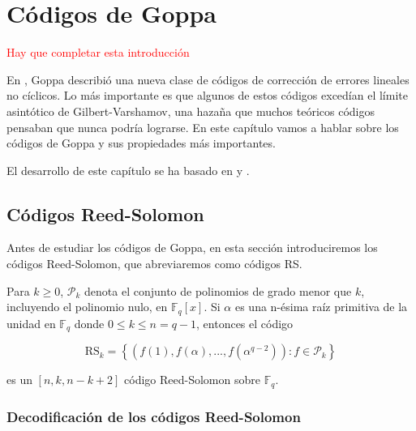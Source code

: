 
\chapter{Códigos de Goppa}

\textcolor{red}{Hay que completar esta introducción}

En \cite{Goppa_codes_1973}, Goppa describió una nueva clase de códigos de corrección de errores lineales no cíclicos. Lo más importante es que algunos de estos códigos excedían el límite asintótico de Gilbert-Varshamov, una hazaña que muchos teóricos códigos pensaban que nunca podría lograrse. En este capítulo vamos a hablar sobre los códigos de Goppa y sus propiedades más importantes.

El desarrollo de este capítulo se ha basado en \cite{Huffman_Pless_2010} y \cite{Goppa_codes_1973}.

\section{Códigos Reed-Solomon}

Antes de estudiar los códigos de Goppa, en esta sección introduciremos los códigos Reed-Solomon, que abreviaremos como códigos RS.

\begin{definition}
    Para $k \geq 0$, $\mathcal{P}_k$ denota el conjunto de polinomios de grado menor que $k$, incluyendo el polinomio nulo, en $\mathbb{F}_q[x]$. Si $\alpha$ es una n-ésima raíz primitiva de la unidad en $\mathbb{F}_q$ donde $0 \leq k \leq n = q - 1$, entonces el código

    $$\text{RS}_k = \left\{ \left( f(1), f(\alpha), ..., f(\alpha^{q-2}) \right) : f \in \mathcal{P}_k \right\}$$

    es un $[n, k, n - k + 2]$ código Reed-Solomon sobre $\mathbb{F}_q$.
\end{definition}

\subsection{Decodificación de los códigos Reed-Solomon}

